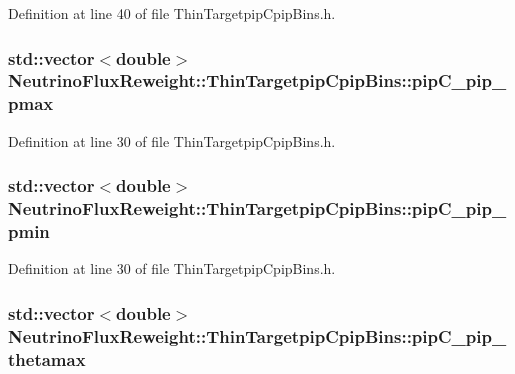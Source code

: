 Definition at line 40 of file Thin\-Targetpip\-Cpip\-Bins.\-h.

\hypertarget{class_neutrino_flux_reweight_1_1_thin_targetpip_cpip_bins_a6f8aa4a79f5c0aa512633d84ab822ac2}{
\subsubsection[{pip\-C\-\_\-pip\-\_\-pmax}]{\setlength{\rightskip}{0pt plus 5cm}std\-::vector$<$double$>$ Neutrino\-Flux\-Reweight\-::\-Thin\-Targetpip\-Cpip\-Bins\-::pip\-C\-\_\-pip\-\_\-pmax}}\label{class_neutrino_flux_reweight_1_1_thin_targetpip_cpip_bins_a6f8aa4a79f5c0aa512633d84ab822ac2}


Definition at line 30 of file Thin\-Targetpip\-Cpip\-Bins.\-h.

\hypertarget{class_neutrino_flux_reweight_1_1_thin_targetpip_cpip_bins_a874e14ecf5a53ec934fbb5f9ed813592}{
\subsubsection[{pip\-C\-\_\-pip\-\_\-pmin}]{\setlength{\rightskip}{0pt plus 5cm}std\-::vector$<$double$>$ Neutrino\-Flux\-Reweight\-::\-Thin\-Targetpip\-Cpip\-Bins\-::pip\-C\-\_\-pip\-\_\-pmin}}\label{class_neutrino_flux_reweight_1_1_thin_targetpip_cpip_bins_a874e14ecf5a53ec934fbb5f9ed813592}


Definition at line 30 of file Thin\-Targetpip\-Cpip\-Bins.\-h.

\hypertarget{class_neutrino_flux_reweight_1_1_thin_targetpip_cpip_bins_aa6811f55516db221df561b1fe1bfd6f0}{
\subsubsection[{pip\-C\-\_\-pip\-\_\-thetamax}]{\setlength{\rightskip}{0pt plus 5cm}std\-::vector$<$double$>$ Neutrino\-Flux\-Reweight\-::\-Thin\-Targetpip\-Cpip\-Bins\-::pip\-C\-\_\-pip\-\_\-thetamax}}\label{class_neutrino_flux_reweight_1_1_thin_targetpip_cpip_bins_aa6811f55516db221df561b1fe1bfd6f0}


